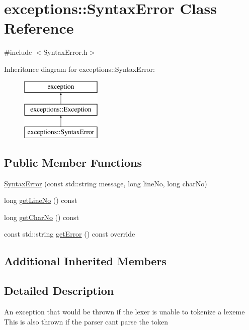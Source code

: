\hypertarget{classexceptions_1_1SyntaxError}{}\section{exceptions\+:\+:Syntax\+Error Class Reference}
\label{classexceptions_1_1SyntaxError}


{\ttfamily \#include $<$Syntax\+Error.\+h$>$}

Inheritance diagram for exceptions\+:\+:Syntax\+Error\+:\begin{figure}[H]
\begin{center}
\leavevmode
\includegraphics[height=3.000000cm]{d3/df7/classexceptions_1_1SyntaxError}
\end{center}
\end{figure}
\subsection*{Public Member Functions}
\begin{DoxyCompactItemize}
\item 
\hyperlink{classexceptions_1_1SyntaxError_ad47c8f8926f591f2d7a2d7e8a7c044a1}{Syntax\+Error} (const std\+::string message, long line\+No, long char\+No)
\item 
long \hyperlink{classexceptions_1_1SyntaxError_a250a5032a546390f979c3ff624a88ead}{get\+Line\+No} () const
\item 
long \hyperlink{classexceptions_1_1SyntaxError_aac30c99ba9e1f9cf75505c7150a72230}{get\+Char\+No} () const
\item 
const std\+::string \hyperlink{classexceptions_1_1SyntaxError_a76804893bdba149c9dc7df4f26be31e0}{get\+Error} () const override
\end{DoxyCompactItemize}
\subsection*{Additional Inherited Members}


\subsection{Detailed Description}
An exception that would be thrown if the lexer is unable to tokenize a lexeme This is also thrown if the parser can\textquotesingle{}t parse the token 


